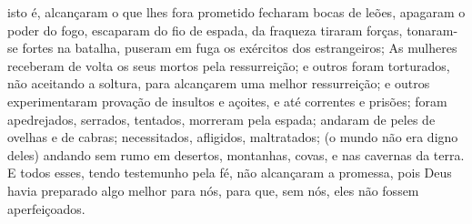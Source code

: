 {{isto é, alcançaram o que lhes fora prometido
} fecharam bocas de leões,
  apagaram o poder do fogo, escaparam do fio de espada, da fraqueza tiraram forças, tonaram-se fortes na batalha, puseram em fuga os exércitos dos estrangeiros;
  As mulheres receberam de volta os seus mortos pela ressurreição; e outros foram torturados, não aceitando a soltura, para alcançarem uma melhor ressurreição;
  e outros experimentaram provação de insultos e açoites, e até correntes e prisões;
  foram apedrejados, serrados, tentados, morreram pela espada; andaram
{} de peles de ovelhas e de cabras; necessitados, afligidos, maltratados;
  (o mundo não era digno deles) andando sem rumo em desertos, montanhas, covas, e nas cavernas da terra.
  E todos esses,
{} tendo testemunho pela fé, não alcançaram a promessa,
  pois Deus havia preparado algo melhor para nós, para que, sem nós, eles não fossem aperfeiçoados.
\par }

